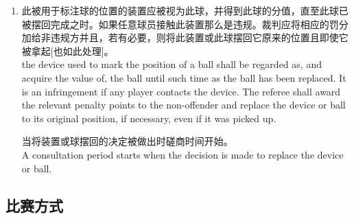 \begin{enumerate}[label=(\alph*)]
\begin{enumerate}[label=(\roman*)]
        the position of the ball shall be marked by a suitable device prior to the ball being lifted for cleaning;
        \item \label{2232cii}此被用于标注球的位置的装置应被视为此球，并得到此球的分值，直至此球已被摆回完成之时。如果任意球员接触此装置那么是违规。裁判应将相应的罚分加给非违规方并且，若有必要，则将此装置或此球摆回它原来的位置且即使它被拿起[也如此处理]。\\
        the device used to mark the position of a ball shall be regarded as, and acquire the value of, the ball until such time as the ball has been replaced. It is an infringement if any player contacts the device. The referee shall award the relevant penalty points to the non-offender and replace the device or ball to its original position, if necessary, even if it was picked up.

        当将装置或球摆回的决定被做出时磋商时间开始。\\
        A consultation period starts when the decision is made to replace the device or ball.
    \end{enumerate}
\end{enumerate}

\subsection{比赛方式}\label{2233}

